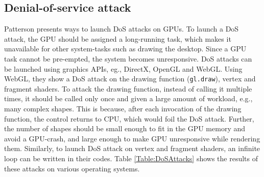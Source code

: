 \subsection{Denial-of-service attack}\label{sec:denialofservice}

Patterson \cite{patterson2013vulnerability} presents ways to launch DoS attacks   on GPUs. To launch a DoS attack, the GPU  should be assigned a long-running task, which makes it unavailable for other system-tasks such as drawing the desktop. Since a GPU task cannot be pre-empted, the system becomes unresponsive. DoS attacks can be launched using graphics APIs, eg., DirectX,  OpenGL and WebGL. Using WebGL, they show a DoS attack   on the drawing function ({\tt gl.draw}), vertex and fragment shaders. To attack the drawing function, instead of calling it multiple times, it should be called only once and given a large amount of workload, e.g., many complex shapes. This is because, after each invocation of the drawing function, the control returns to CPU, which would foil the DoS attack. Further, the number of shapes should be small enough to fit in the GPU memory and avoid a GPU-crash, and large enough to make GPU unresponsive while rendering them. Similarly, to launch DoS attack on vertex and fragment shaders, an infinite loop can be written in their codes. Table \ref{Table:DoSAttacks}  shows the results of these attacks on various operating systems. 



